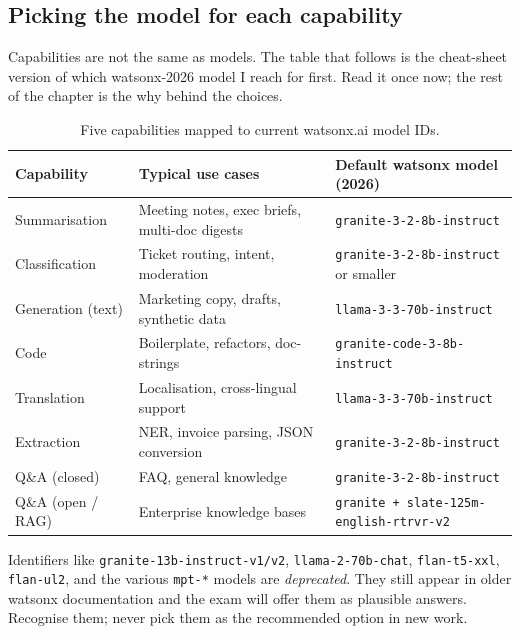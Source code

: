 
\subsection{Picking the model for each capability}

Capabilities are not the same as models. The table that follows is the cheat-sheet version of which watsonx-2026 model I reach for first. Read it once now; the rest of the chapter is the why behind the choices.

\begin{table}[h]
\centering
\small
\begin{tabularx}{\textwidth}{l X l}
\toprule
\textbf{Capability} & \textbf{Typical use cases} & \textbf{Default watsonx model (2026)} \\
\midrule
Summarisation       & Meeting notes, exec briefs, multi-doc digests     & \texttt{granite-3-2-8b-instruct} \\
Classification      & Ticket routing, intent, moderation                & \texttt{granite-3-2-8b-instruct} or smaller \\
Generation (text)   & Marketing copy, drafts, synthetic data            & \texttt{llama-3-3-70b-instruct} \\
\quad Code          & Boilerplate, refactors, doc-strings               & \texttt{granite-code-3-8b-instruct} \\
\quad Translation   & Localisation, cross-lingual support               & \texttt{llama-3-3-70b-instruct} \\
Extraction          & NER, invoice parsing, JSON conversion             & \texttt{granite-3-2-8b-instruct} \\
Q\&A (closed)       & FAQ, general knowledge                            & \texttt{granite-3-2-8b-instruct} \\
Q\&A (open / RAG)   & Enterprise knowledge bases                        & \texttt{granite + slate-125m-english-rtrvr-v2} \\
\bottomrule
\end{tabularx}
\caption{Five capabilities mapped to current watsonx.ai model IDs.}
\label{tab:capabilities-models}
\end{table}

\begin{warningbox}
Identifiers like \texttt{granite-13b-instruct-v1/v2}, \texttt{llama-2-70b-chat}, \texttt{flan-t5-xxl}, \texttt{flan-ul2}, and the various \texttt{mpt-*} models are \emph{deprecated}. They still appear in older watsonx documentation and the exam will offer them as plausible answers. Recognise them; never pick them as the recommended option in new work.
\end{warningbox}


